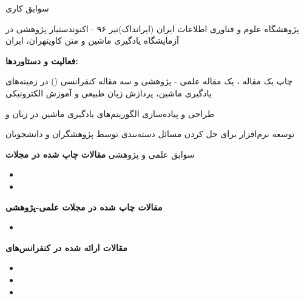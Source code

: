\documentclass{resume} %
\begin{document}
%

\begin{rSection}{سوابق‌ کاری}
\def\jobtitle{دستیار پژوهشی در آزمایشگاه یادگیری ماشین و متن کاوی}
\def\employername{پژوهشگاه علوم و فناوری اطلاعات ایران (ایرانداک)}
\def\years{تیر ۹۶ - اکنون}
\def\location{تهران، ایران}

\begin{rSubsection}{\employername}{\years}{\jobtitle}{\location}

\textbf{فعالیت و دستاوردها:}
\item چاپ یک مقاله ، یک مقاله علمی - پژوهشی و سه مقاله کنفرانسی () در زمینه‌های یادگیری ماشین، پردازش زبان طبیعی و آموزش الکترونیکی
\item طراحی و پیاده‌سازی الگوریتم‌های یادگیری ماشین در زبان  و 
\item توسعه نرم‌افزار  برای حل کردن مسائل دسته‌بندی توسط پژوهشگران و دانشجویان

\end{rSubsection}

%
\end{rSection}
%
\begin{rSection}{سوابق علمی و پژوهشی}
\small\textbf{مقالات چاپ شده در مجلات }
\begin{latin}
\begin{itemize}
	\item {}
	\item {}
\end{itemize}
\end{latin}

\small\textbf{مقالات چاپ شده در مجلات علمی-پژوهشی}
{\footnotesize
\begin{itemize}
	\item {}
\end{itemize}
}

\small\textbf{مقالات ارائه شده در کنفرانس‌های }
{\footnotesize
\begin{itemize}
	\item {}
	\item {}
	\item {}
\end{itemize}
}
\end{rSection}
\end{document}
